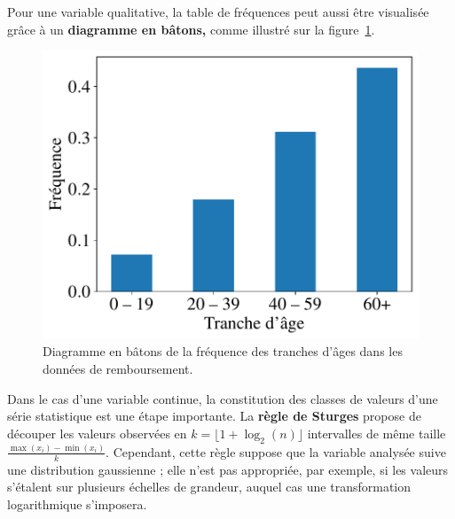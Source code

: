 Pour une variable qualitative, la table de fréquences peut aussi être
visualisée grâce à un \textbf{diagramme en bâtons,} comme illustré sur la
figure~\ref{fig:remboursement_age_bars}.
\begin{figure}[h]
  \centering
    \includegraphics[width=.5\textwidth]{figures/stats/remboursement_age_bars}
  \caption{Diagramme en bâtons de la fréquence des tranches d'âges dans les
    données de remboursement.}
  \label{fig:remboursement_age_bars}
\end{figure}

Dans le cas d'une variable continue, la constitution des classes de valeurs
d'une série statistique est une étape importante. La \textbf{règle de Sturges}
propose de découper les valeurs observées en $k = \lfloor 1 + \log_2(n)\rfloor$
intervalles de même taille $\frac{\max(x_i) - \min(x_i)}{k}$. Cependant, cette
règle suppose que la variable analysée suive une distribution gaussienne ; elle
n'est pas appropriée, par exemple, si les valeurs s'étalent sur plusieurs
échelles de grandeur, auquel cas une transformation logarithmique s'imposera.


